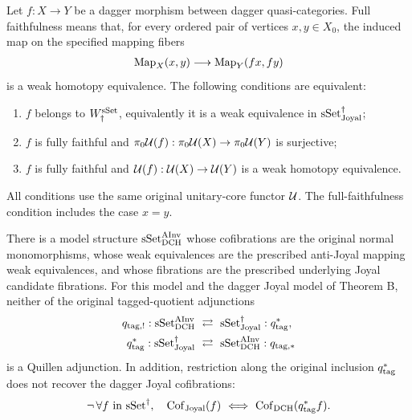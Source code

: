 \begin{resultblock}
\begin{theorem}
Let $f:X\to Y$ be a dagger morphism between dagger quasi-categories.
Full faithfulness means that, for every ordered pair of vertices $x,y\in X_0$, the induced map on the specified mapping fibers
\begin{align}
\operatorname{Map}_X(x,y)\longrightarrow\operatorname{Map}_Y(fx,fy)
\end{align}
is a weak homotopy equivalence.
The following conditions are equivalent:
\begin{enumerate}
\item $f$ belongs to $W^{\mathrm{sSet}}_{\dag}$, equivalently it is a weak equivalence in $\mathrm{sSet}^{\dag}_{\mathrm{Joyal}}$;
\item $f$ is fully faithful and $\pi_0\mathcal{U}(f):\pi_0\mathcal{U}(X)\to\pi_0\mathcal{U}(Y)$ is surjective;
\item $f$ is fully faithful and $\mathcal{U}(f):\mathcal{U}(X)\to\mathcal{U}(Y)$ is a weak homotopy equivalence.
\end{enumerate}
All conditions use the same original unitary-core functor $\mathcal{U}$.
The full-faithfulness condition includes the case $x=y$.
\end{theorem}
\end{resultblock}

\begin{resultblock}
\begin{theorem}
There is a model structure $\mathrm{sSet}^{\mathrm{AInv}}_{\mathrm{DCH}}$ whose cofibrations are the original normal monomorphisms, whose weak equivalences are the prescribed anti-Joyal mapping weak equivalences, and whose fibrations are the prescribed underlying Joyal candidate fibrations.
For this model and the dagger Joyal model of Theorem B, neither of the original tagged-quotient adjunctions
\begin{align}
q_{\mathrm{tag},!}:\mathrm{sSet}^{\mathrm{AInv}}_{\mathrm{DCH}}
&\ \rightleftarrows\ \mathrm{sSet}^{\dag}_{\mathrm{Joyal}}:q_{\mathrm{tag}}^*,\\
q_{\mathrm{tag}}^*:\mathrm{sSet}^{\dag}_{\mathrm{Joyal}}
&\ \rightleftarrows\ \mathrm{sSet}^{\mathrm{AInv}}_{\mathrm{DCH}}:q_{\mathrm{tag},*}
\end{align}
is a Quillen adjunction.
In addition, restriction along the original inclusion $q_{\mathrm{tag}}^*$ does not recover the dagger Joyal cofibrations:
\begin{align}
\neg\,\forall f\text{ in }\mathrm{sSet}^{\dag},\quad
\operatorname{Cof}_{\mathrm{Joyal}}(f)\ \Longleftrightarrow\ \operatorname{Cof}_{\mathrm{DCH}}(q_{\mathrm{tag}}^*f).
\end{align}
\end{theorem}
\end{resultblock}
